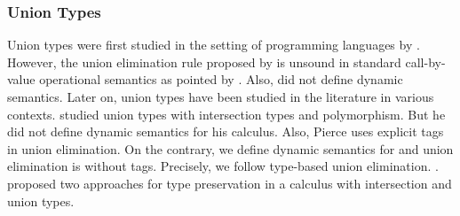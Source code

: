 \subsubsection*{Union Types}
\begin{comment}
Set-theoretic unions have sound theory and extensively studied in
mathematics. Set-theoretic unions correspond to union types or
disjoint union types in programming languages. Disjoint union types
are also called sum types or variants.  Constructors are explicitly
labeled in disjoint union types and expressions are manipulated using
corresponding labels. Few other interesting calculi (and this paper)
do not use labels and provide type-based union elimination.
\end{comment}
Union types were first studied in the setting of programming languages
by \citet{macqueen1984ideal}. However, the union elimination rule
proposed by \citet{macqueen1984ideal} is unsound in standard call-by-value
operational semantics as pointed by \cite{dunfield2003type}.
Also, \citet{macqueen1984ideal} did not define dynamic semantics.
Later on, union types have been studied
in the literature in various contexts. \citet{pierce1991programming}
studied union types with intersection types and polymorphism. But he
did not define dynamic semantics for his calculus. Also, Pierce
uses explicit tags in union elimination. On the contrary, we define
dynamic semantics for \cal and union elimination is without tags.
Precisely, we follow type-based union elimination.
.
\citet{barbanera1995intersection} proposed
two approaches for type preservation in a calculus with intersection and union
types.

